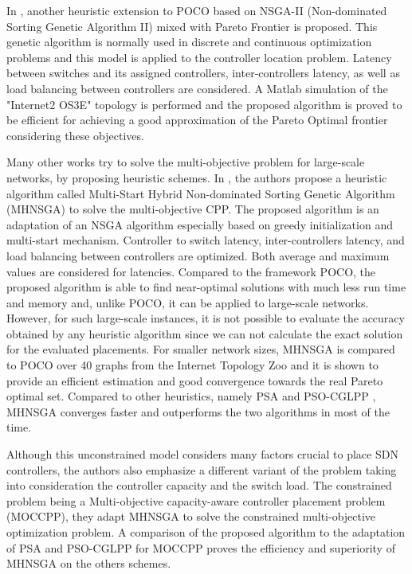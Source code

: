 \documentclass{IEEEtran}
\begin{document}
In \cite{JaAh15}, another heuristic extension to POCO based on NSGA-II (Non-dominated Sorting Genetic Algorithm II)  mixed with Pareto Frontier is proposed. This genetic algorithm is normally used in discrete and continuous optimization problems and this model is applied to the controller location problem. Latency between switches and its assigned controllers, inter-controllers latency, as well as load balancing between controllers are considered. A Matlab simulation of the "Internet2 OS3E" topology is performed and the proposed algorithm is proved to be efficient for achieving a good approximation of the Pareto Optimal frontier considering these objectives. 

Many other works try to solve the multi-objective problem for large-scale networks, by proposing heuristic schemes. In \cite{VaMo18}, the authors propose a heuristic algorithm called Multi-Start Hybrid Non-dominated Sorting Genetic Algorithm (MHNSGA) to solve the multi-objective CPP. The proposed algorithm is an adaptation of an NSGA algorithm especially based on greedy initialization and multi-start mechanism. Controller to switch latency, inter-controllers latency, and load balancing between controllers are optimized. Both average and maximum values are considered for latencies. Compared to the framework POCO, the proposed algorithm is able to find near-optimal solutions with much less run time and memory and, unlike POCO, it can be applied to large-scale networks. However, for such large-scale instances, it is not possible to evaluate the accuracy obtained by any heuristic algorithm since we can not calculate the exact solution for the evaluated placements. For smaller network sizes, MHNSGA is compared to POCO over 40 graphs from the Internet Topology Zoo and it is shown to provide an efficient estimation and good convergence towards the real Pareto optimal set. Compared to other heuristics, namely PSA \cite{LaGe15} and PSO-CGLPP \cite{GaWa15}, MHNSGA converges faster and outperforms the two algorithms in most of the time.  

Although this unconstrained model considers many factors crucial to place SDN controllers, the authors also emphasize a different variant of the problem taking into consideration the controller capacity and the switch load. The constrained problem being a Multi-objective capacity-aware controller placement problem (MOCCPP), they adapt MHNSGA to solve the constrained multi-objective optimization problem. A comparison of the proposed algorithm to the adaptation of PSA and  PSO-CGLPP for MOCCPP proves the efficiency and superiority of MHNSGA on the others schemes.
\end{document}
